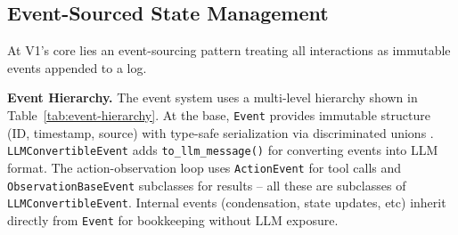 \subsection{Event-Sourced State Management}
\label{sec:event-sourcing}

At V1's core lies an event-sourcing pattern treating all interactions as immutable events appended to a log.

\textbf{Event Hierarchy.}
The event system uses a multi-level hierarchy shown in Table~\ref{tab:event-hierarchy}. At the base, \texttt{Event} provides immutable structure (ID, timestamp, source) with type-safe serialization via discriminated unions \citep{pydantic_discriminated_unions}. \texttt{LLMConvertibleEvent} adds \texttt{to\_llm\_message()} for converting events into LLM format. The action-observation loop uses \texttt{ActionEvent} for tool calls and \texttt{ObservationBaseEvent} subclasses for results -- all these are subclasses of \texttt{LLMConvertibleEvent}. Internal events (condensation, state updates, etc) inherit directly from \texttt{Event} for bookkeeping without LLM exposure.

